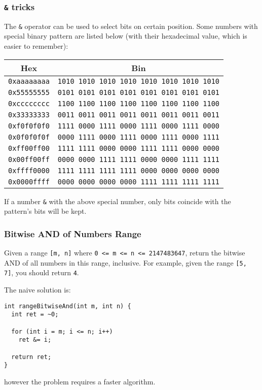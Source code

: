 \documentclass[12pt]{article}
\begin{document}
\subsubsection{\texttt{\&} tricks}
\label{sec:orgf56e4c4}
The \texttt{\&} operator can be used to select bits on certain position. Some numbers with special binary pattern are listed below (with their hexadecimal value, which is easier to remember):
\begin{center}
\begin{tabular}{cc}
Hex & Bin\\
\hline
\texttt{0xaaaaaaaa} & \texttt{1010 1010 1010 1010 1010 1010 1010 1010}\\
\texttt{0x55555555} & \texttt{0101 0101 0101 0101 0101 0101 0101 0101}\\
\texttt{0xcccccccc} & \texttt{1100 1100 1100 1100 1100 1100 1100 1100}\\
\texttt{0x33333333} & \texttt{0011 0011 0011 0011 0011 0011 0011 0011}\\
\texttt{0xf0f0f0f0} & \texttt{1111 0000 1111 0000 1111 0000 1111 0000}\\
\texttt{0x0f0f0f0f} & \texttt{0000 1111 0000 1111 0000 1111 0000 1111}\\
\texttt{0xff00ff00} & \texttt{1111 1111 0000 0000 1111 1111 0000 0000}\\
\texttt{0x00ff00ff} & \texttt{0000 0000 1111 1111 0000 0000 1111 1111}\\
\texttt{0xffff0000} & \texttt{1111 1111 1111 1111 0000 0000 0000 0000}\\
\texttt{0x0000ffff} & \texttt{0000 0000 0000 0000 1111 1111 1111 1111}\\
\end{tabular}
\end{center}

If a number \texttt{\&} with the above special number, only bits coincide with the pattern's bits will be kept.

\subsubsection{Bitwise AND of Numbers Range}
\label{sec:orgcba0701}
Given a range \texttt{[m, n]} where \texttt{0 <= m <= n <= 2147483647}, return the bitwise AND of all numbers in this range, inclusive. For example, given the range \texttt{[5, 7]}, you should return \texttt{4}.

The naive solution is:
\begin{verbatim}
int rangeBitwiseAnd(int m, int n) {
  int ret = ~0;

  for (int i = m; i <= n; i++)
    ret &= i;

  return ret;
}
\end{verbatim}
however the problem requires a faster algorithm.
\end{document}

